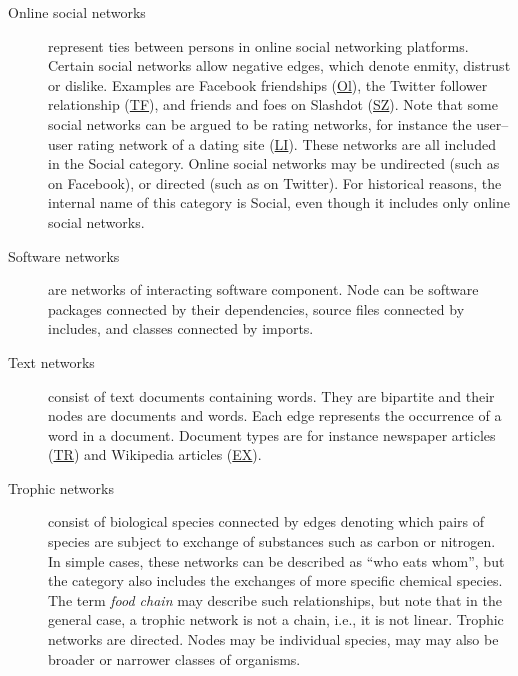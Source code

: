 \documentclass{article}
\begin{document}
\begin{description}
\item[Online social networks] represent ties between
   persons in online social networking
  platforms.  Certain social networks allow negative edges, which denote
  enmity, distrust or dislike.  Examples are Facebook friendships
  (\href{http://konect.cc/networks/facebook-wosn-links/}{\textsf{Ol}}),
  the
  Twitter follower relationship
  (\href{http://konect.cc/networks/twitter_mpi/}{\textsf{TF}}), and
  friends and foes on Slashdot
  (\href{http://konect.cc/networks/slashdot-zoo/}{\textsf{SZ}}).  Note
  that some social networks can be argued to be rating networks, for
  instance the user--user rating network of a dating site
  (\href{http://konect.cc/networks/libimseti/}{\textsf{LI}}).  These
  networks are all included in the \textsf{Social} category.
  Online social networks may be undirected (such as on Facebook),
  or directed (such as on Twitter).
  For historical reasons, the internal name of this category is
  \textsf{Social}, even though it includes only online social networks. 

\item[Software networks] are networks of interacting software
   component.  Node can be software
  packages connected by their dependencies, source files connected by
  includes, and classes connected by imports.

\item[Text networks] consist of text documents containing words.  They
   are bipartite and their nodes are documents
  and words.  Each edge represents the occurrence of a word in a
  document. Document types are for instance newspaper articles
  (\href{http://konect.cc/networks/gottron-trec/}{\textsf{TR}}) and
  Wikipedia articles
  (\href{http://konect.cc/networks/gottron-excellent/}{\textsf{EX}}).

\item[Trophic networks] consist of biological 
   species connected by edges denoting which
  pairs of species are subject to exchange of substances such as carbon
  or nitrogen.  In simple cases, these networks can be described as
  ``who eats whom'', but the category also includes the exchanges of
  more specific chemical species. 
  The term \emph{food chain} may describe such relationships,
  but note that in the general case, a trophic network is not a chain,
  i.e., it is not linear.  Trophic networks are directed.  Nodes may be
  individual species, may may also be broader or narrower classes of
  organisms. 

\end{description}
\end{document}
